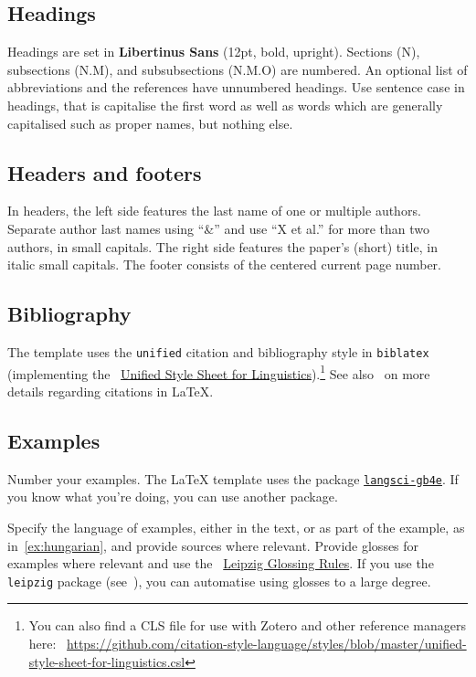 \subsection{Headings}

Headings are set in \textsf{\textbf{Libertinus Sans}} (12pt, bold, upright).
Sections (N), subsections (N.M), and subsubsections (N.M.O) are numbered. An
optional list of abbreviations and the references have unnumbered headings.
Use sentence case in headings, that is capitalise the first word as well as
words which are generally capitalised such as proper names, but nothing else.

\subsection{Headers and footers}

In headers, the left side features the last name of one or multiple authors.
Separate author last names using \enquote{\&} and use \enquote{X et al.} for
more than two authors, in small capitals. The right side features the paper's
(short) title, in italic small capitals.
%
The footer consists of the centered current page number.

\subsection{Bibliography}

The template uses the \texttt{unified} citation and bibliography style in
\texttt{biblatex} (implementing the
\faExternalLink*{}~\href{https://clas.wayne.edu/linguistics/resources/style}{Unified
    Style Sheet for Linguistics}).\footnote{You can also find a CLS file for use
    with Zotero and other reference managers here:
\faExternalLink*{}~\url{https://github.com/citation-style-language/styles/blob/master/unified-style-sheet-for-linguistics.csl}}
See also~ on more details regarding citations in \LaTeX.

\subsection{Examples}

Number your examples. The \LaTeX{} template uses the package
\faExternalLink*{}
\href{https://ctan.mines-albi.fr/macros/xetex/latex/langsci/documentation/langsci-gb4.pdf}{\texttt{langsci-gb4e}}.
If you know what you're doing, you can use another package.

Specify the language of examples, either in the text, or as part of the example,
as in~\eqref{ex:hungarian}, and provide sources where relevant. Provide glosses
for examples where relevant and use the
\faExternalLink*{}~\href{https://www.eva.mpg.de/lingua/pdf/Glossing-Rules.pdf}{Leipzig
Glossing Rules}. If you use the \texttt{leipzig} package
(see~), you can automatise using glosses to a large degree.


